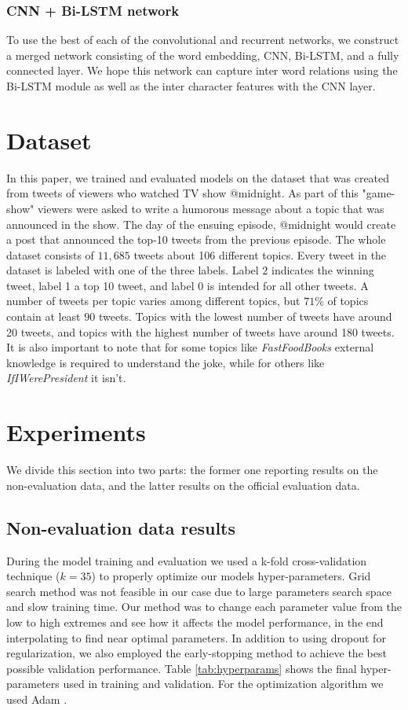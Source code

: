 \documentclass[10pt, a4paper]{article}
\begin{document}
\subsubsection{CNN + Bi-LSTM network}
To use the best of each of the convolutional and recurrent networks, we
construct a merged network consisting of the word embedding, CNN, Bi-LSTM, and
a fully connected layer. We hope this network can capture inter word relations
using the Bi-LSTM module as well as the inter character features with the CNN
layer.

\section{Dataset}
In this paper, we trained and evaluated models on the dataset that was created
from tweets of viewers who watched TV show @midnight. As part of this "game-show"
viewers were asked to write a humorous message about a topic that was announced
in the show. The day of the ensuing episode, @midnight would create a post that
announced the top-10 tweets from the previous episode. The whole dataset consists
of $11,685$ tweets about 106 different topics. Every tweet in the dataset is
labeled with one of the three labels. Label $2$ indicates the winning tweet, label 1
a top 10 tweet, and label 0 is intended for all other
tweets. A number of tweets per topic varies among different topics, but $71\%$ of
topics contain at least $90$ tweets. Topics with the lowest number of tweets have 
around 20 tweets, and topics with the highest number of tweets have around 180 tweets.
It is also important to note that for some topics like \emph{FastFoodBooks} external
knowledge is required to understand the joke, while for others like
\emph{IfIWerePresident} it isn't.

\section{Experiments}
We divide this section into two parts: the former one reporting results on the non-evaluation data, and the latter results on the official evaluation data.

\subsection{Non-evaluation data results}
During the model training and evaluation we used a k-fold cross-validation technique ($k=35$) to properly optimize our models hyper-parameters. Grid search method was not feasible in our case due to large parameters search space and slow training time. Our method was to change each parameter value from the low to high extremes and see how it affects the model performance, in the end interpolating to find near optimal parameters. In addition to using dropout for regularization, we also employed the early-stopping \citep{caruana2000overfitting} method to achieve the best possible validation performance. Table \ref{tab:hyperparams} shows the final hyper-parameters used in training and validation. For the optimization algorithm we used Adam \citep{adam2014}.
\end{document}
